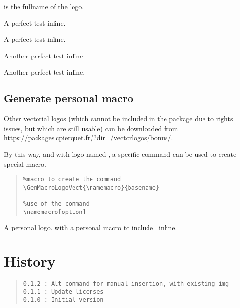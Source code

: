 \documentclass[11pt,a4paper]{ltxdoc}
\begin{document}
 is the fullname of the logo.

\begin{tcblisting}{}
{\Huge A perfect test  inline.}
\end{tcblisting}

\begin{tcblisting}{}
{\Huge A perfect test  inline.}
\end{tcblisting}

\begin{tcblisting}{}
{\LARGE Another perfect test  inline.}
\end{tcblisting}

\begin{tcblisting}{}
{\LARGE Another perfect test  inline.}
\end{tcblisting}

\subsection{Generate personal macro}

Other vectorial logos (which cannot be included in the package due to rights issues, but which are still usable) can be downloaded from \url{https://packages.cpierquet.fr/?dir=/vectorlogos/bonus/}.

\smallskip

By this way, and with logo named , a specific command can be used to create special macro.

\begin{quote}
\begin{verbatim}
%macro to create the command
\GenMacroLogoVect{\namemacro}{basename}

%use of the command
\namemacro[option]
\end{verbatim}
\end{quote}

\begin{tcblisting}{}
{\LARGE A personal logo, with a personal macro to include \logoxcas\ inline.}
\end{tcblisting}

\pagebreak

\section{History}

\begin{quote}
\begin{verbatim}
0.1.2 : Alt command for manual insertion, with existing img
0.1.1 : Update licenses
0.1.0 : Initial version
\end{verbatim}
\end{quote}
\end{document}
